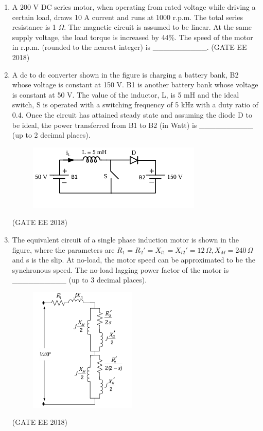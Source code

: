 \documentclass[journal,12pt,onecolumn]{IEEEtran}
\theoremstyle{remark}
\begin{document}
\begin{enumerate}
\item A 200 V DC series motor, when operating from rated voltage while driving a certain load, draws 10 A current and runs at 1000 r.p.m. The total series resistance is 1 $\Omega$. The magnetic circuit is assumed to be linear. At the same supply voltage, the load torque is increased by 44\%. The speed of the motor in r.p.m. (rounded to the nearest integer) is \_\_\_\_\_\_\_\_\_\_.
\hfill{(GATE EE 2018)}

\item A dc to dc converter shown in the figure is charging a battery bank, B2 whose voltage is constant at 150 V. B1 is another battery bank whose voltage is constant at 50 V. The value of the inductor, L, is 5 mH and the ideal switch, S is operated with a switching frequency of 5 kHz with a duty ratio of 0.4. Once the circuit has attained steady state and assuming the diode D to be ideal, the power transferred from B1 to B2 (in Watt) is \_\_\_\_\_\_\_\_\_\_ (up to 2 decimal places).
\begin{figure}[H]
    \centering
    \includegraphics[]{figs/Q.53.png}
    \caption{}
    \label{fig:24}
\end{figure}
\hfill{(GATE EE 2018)}

\item The equivalent circuit of a single phase induction motor is shown in the figure, where the parameters are $R_1=R_2'=X_{l1}=X_{l2}'=12 \, \Omega, X_M=240 \, \Omega$ and s is the slip. At no-load, the motor speed can be approximated to be the synchronous speed. The no-load lagging power factor of the motor is \_\_\_\_\_\_\_\_\_\_ (up to 3 decimal places).
\begin{figure}[H]
    \centering
    \includegraphics[]{figs/Q.54.png}
    \caption{}
    \label{fig:25}
\end{figure}
\hfill{(GATE EE 2018)}


\end{enumerate}
\end{document}
